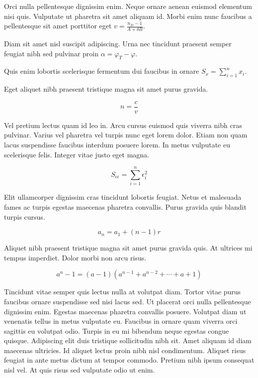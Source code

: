 \documentclass{article}
\begin{document}
	
    Orci nulla pellentesque dignissim enim. Neque ornare aenean euismod elementum nisi quis. Vulputate ut pharetra sit amet aliquam id. Morbi enim nunc faucibus a pellentesque sit amet porttitor eget  \begin{math}
    	v=\frac{n_D-1}{A+\delta B}
    \end{math}.
    \newline
    
   Diam sit amet nisl suscipit adipiscing. Urna nec tincidunt praesent semper feugiat nibh sed pulvinar proin $ \alpha=\varphi_T-\varphi $.
   \newline
    
    Quis enim lobortis scelerisque fermentum dui faucibus in ornare \( S_x=\sum_{i=1}^{n}x_i \).
    \newline
    
    Eget aliquet nibh praesent tristique magna sit amet purus gravida.
    
    \[ n=\frac{c}{v}  \]
    
    Vel pretium lectus quam id leo in. Arcu cursus euismod quis viverra nibh cras pulvinar. Varius vel pharetra vel turpis nunc eget lorem dolor. Etiam non quam lacus suspendisse faucibus interdum posuere lorem. In metus vulputate eu scelerisque felis. Integer vitae justo eget magna.
    
    $$ S_{\epsilon \epsilon}=\sum_{i=1}^{n}\epsilon_i^2 $$
    
    Elit ullamcorper dignissim cras tincidunt lobortis feugiat. Netus et malesuada fames ac turpis egestas maecenas pharetra convallis. Purus gravida quis blandit turpis cursus. 
    
    \begin{displaymath}
    	a_n=a_1+(n-1)r
    \end{displaymath}
    
    Aliquet nibh praesent tristique magna sit amet purus gravida quis. At ultrices mi tempus imperdiet. Dolor morbi non arcu risus.
    
    \begin{equation}
    	a^n-1=(a-1)(a^{n-1}+a^{n-2}+\cdots+a+1)
    \end{equation}
    
    Tincidunt vitae semper quis lectus nulla at volutpat diam. Tortor vitae purus faucibus ornare suspendisse sed nisi lacus sed. Ut placerat orci nulla pellentesque dignissim enim. Egestas maecenas pharetra convallis posuere. Volutpat diam ut venenatis tellus in metus vulputate eu. Faucibus in ornare quam viverra orci sagittis eu volutpat odio. Turpis in eu mi bibendum neque egestas congue quisque. Adipiscing elit duis tristique sollicitudin nibh sit. Amet aliquam id diam maecenas ultricies. Id aliquet lectus proin nibh nisl condimentum. Aliquet risus feugiat in ante metus dictum at tempor commodo. Pretium nibh ipsum consequat nisl vel. At quis risus sed vulputate odio ut enim.
    
\end{document}
